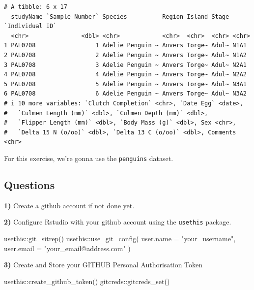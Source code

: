 \documentclass[
  letterpaper,
  DIV=11,
  numbers=noendperiod]{scrreprt}
\newenvironment{Shaded}{\begin{snugshade}}{\end{snugshade}}
\newcommand{\AttributeTok}[1]{\textcolor[rgb]{0.40,0.45,0.13}{#1}}
\newcommand{\FunctionTok}[1]{\textcolor[rgb]{0.28,0.35,0.67}{#1}}
\newcommand{\NormalTok}[1]{\textcolor[rgb]{0.00,0.23,0.31}{#1}}
\newcommand{\SpecialCharTok}[1]{\textcolor[rgb]{0.37,0.37,0.37}{#1}}
\newcommand{\StringTok}[1]{\textcolor[rgb]{0.13,0.47,0.30}{#1}}
\begin{document}
\begin{verbatim}
# A tibble: 6 x 17
  studyName `Sample Number` Species          Region Island Stage `Individual ID`
  <chr>               <dbl> <chr>            <chr>  <chr>  <chr> <chr>          
1 PAL0708                 1 Adelie Penguin ~ Anvers Torge~ Adul~ N1A1           
2 PAL0708                 2 Adelie Penguin ~ Anvers Torge~ Adul~ N1A2           
3 PAL0708                 3 Adelie Penguin ~ Anvers Torge~ Adul~ N2A1           
4 PAL0708                 4 Adelie Penguin ~ Anvers Torge~ Adul~ N2A2           
5 PAL0708                 5 Adelie Penguin ~ Anvers Torge~ Adul~ N3A1           
6 PAL0708                 6 Adelie Penguin ~ Anvers Torge~ Adul~ N3A2           
# i 10 more variables: `Clutch Completion` <chr>, `Date Egg` <date>,
#   `Culmen Length (mm)` <dbl>, `Culmen Depth (mm)` <dbl>,
#   `Flipper Length (mm)` <dbl>, `Body Mass (g)` <dbl>, Sex <chr>,
#   `Delta 15 N (o/oo)` <dbl>, `Delta 13 C (o/oo)` <dbl>, Comments <chr>
\end{verbatim}

For this exercise, we're gonna use the \texttt{penguins} dataset.

\subsection{Questions}\label{questions-1}

\textbf{1)} Create a github account if not done yet.

\textbf{2)} Configure Rstudio with your github account using the
\texttt{usethis} package.

\begin{Shaded}
\begin{Highlighting}[]
\NormalTok{usethis}\SpecialCharTok{::}\FunctionTok{git\_sitrep}\NormalTok{()}
\NormalTok{usethis}\SpecialCharTok{::}\FunctionTok{use\_git\_config}\NormalTok{(}
  \AttributeTok{user.name =} \StringTok{"your\_username"}\NormalTok{,}
  \AttributeTok{user.email =} \StringTok{"your\_email@address.com"}
\NormalTok{)}
\end{Highlighting}
\end{Shaded}

\textbf{3)} Create and Store your GITHUB Personal Authorisation Token

\begin{Shaded}
\begin{Highlighting}[]
\NormalTok{usethis}\SpecialCharTok{::}\FunctionTok{create\_github\_token}\NormalTok{()}
\NormalTok{gitcreds}\SpecialCharTok{::}\FunctionTok{gitcreds\_set}\NormalTok{()}
\end{Highlighting}
\end{Shaded}
\end{document}
